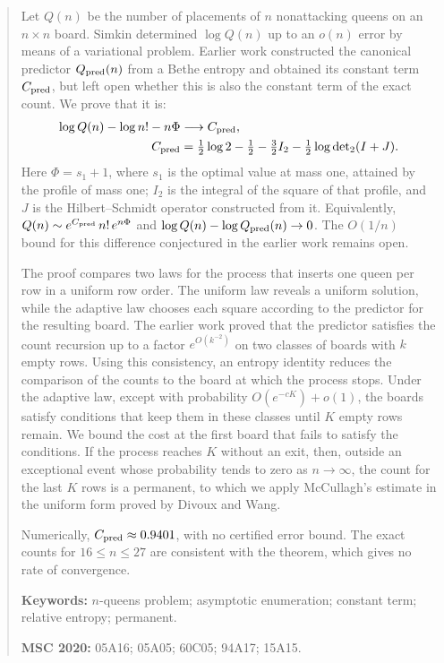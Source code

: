 \begin{abstract}
\noindent Let $Q(n)$ be the number of placements of $n$ nonattacking queens on an $n\times n$
board. Simkin determined $\log Q(n)$ up to an $o(n)$ error by means of a variational problem.
Earlier work constructed the canonical predictor $Q_{\rm pred}(n)$ from a Bethe entropy and obtained
its constant term $C_{\rm pred}$, but left open whether this is also the constant term of the exact
count. We prove that it is:
\[
\begin{aligned}
 \log Q(n)-\log n!-n\Phi &\longrightarrow C_{\rm pred},\\
 C_{\rm pred} &=\tfrac12\log2-\tfrac12-\tfrac32I_2-\tfrac12\log{\det}_2(I+J).
\end{aligned}
\]
Here $\Phi=s_1+1$, where $s_1$ is the optimal value at mass one, attained by the profile of mass
one; $I_2$ is the integral of the square of that profile, and $J$ is the Hilbert--Schmidt operator
constructed from it. Equivalently, $Q(n)\sim e^{C_{\rm pred}}\,n!\,e^{n\Phi}$ and
$\log Q(n)-\log Q_{\rm pred}(n)\to0$. The $O(1/n)$ bound for this difference conjectured in the
earlier work remains open.

\smallskip\noindent The proof compares two laws for the process that inserts one queen per row in a
uniform row order. The uniform law reveals a uniform solution, while the adaptive law
chooses each square according to the predictor for the resulting board. The earlier work proved
that the predictor satisfies the count recursion up to a factor $e^{O(k^{-2})}$ on two classes of
boards with $k$ empty rows. Using this consistency, an entropy identity reduces the comparison of
the counts to the board at which the process stops. Under the adaptive law, except with probability
$O(e^{-cK})+o(1)$, the boards satisfy conditions that keep them in these classes until $K$ empty
rows remain. We bound the cost at the first board that fails to satisfy the conditions. If the
process reaches $K$ without an exit, then, outside an exceptional event whose probability tends to
zero as $n\to\infty$, the count for the last $K$ rows is a permanent, to which we apply McCullagh's
estimate in the uniform form proved by Divoux and Wang.

\smallskip\noindent Numerically, $C_{\rm pred}\approx0.9401$, with no certified error bound. The
exact counts for ${16\le n\le27}$ are consistent with the theorem, which gives no rate of
convergence.

\medskip\noindent
\textbf{Keywords:} $n$-queens problem; asymptotic enumeration; constant term; relative entropy;
permanent.

\noindent
\textbf{MSC 2020:} 05A16; 05A05; 60C05; 94A17; 15A15.
\end{abstract}
